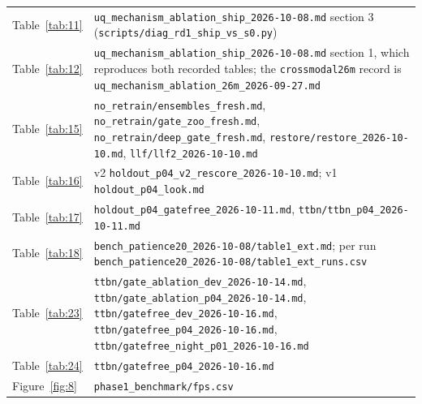 \documentclass[10pt]{article}
\begin{document}
\begin{table}[htbp]
\begin{tabularx}{\linewidth}{l>{\raggedright\arraybackslash}X}
Table~\ref{tab:11} & \texttt{uq\_\allowbreak{}mechanism\_\allowbreak{}ablation\_\allowbreak{}ship\_\allowbreak{}2026-10-08.md} section 3 (\texttt{scripts/\allowbreak{}diag\_\allowbreak{}rd1\_\allowbreak{}ship\_\allowbreak{}vs\_\allowbreak{}s0.py}) \\
Table~\ref{tab:12} & \texttt{uq\_\allowbreak{}mechanism\_\allowbreak{}ablation\_\allowbreak{}ship\_\allowbreak{}2026-10-08.md} section 1, which reproduces both recorded tables; the \texttt{crossmodal26m} record is \texttt{uq\_\allowbreak{}mechanism\_\allowbreak{}ablation\_\allowbreak{}26m\_\allowbreak{}2026-09-27.md} \\
Table~\ref{tab:15} & \texttt{no\_\allowbreak{}retrain/\allowbreak{}ensembles\_\allowbreak{}fresh.md}, \texttt{no\_\allowbreak{}retrain/\allowbreak{}gate\_\allowbreak{}zoo\_\allowbreak{}fresh.md}, \texttt{no\_\allowbreak{}retrain/\allowbreak{}deep\_\allowbreak{}gate\_\allowbreak{}fresh.md}, \texttt{restore/\allowbreak{}restore\_\allowbreak{}2026-10-10.md}, \texttt{llf/\allowbreak{}llf2\_\allowbreak{}2026-10-10.md} \\
Table~\ref{tab:16} & v2 \texttt{holdout\_\allowbreak{}p04\_\allowbreak{}v2\_\allowbreak{}rescore\_\allowbreak{}2026-10-10.md}; v1 \texttt{holdout\_\allowbreak{}p04\_\allowbreak{}look.md} \\
Table~\ref{tab:17} & \texttt{holdout\_\allowbreak{}p04\_\allowbreak{}gatefree\_\allowbreak{}2026-10-11.md}, \texttt{ttbn/\allowbreak{}ttbn\_\allowbreak{}p04\_\allowbreak{}2026-10-11.md} \\
Table~\ref{tab:18} & \texttt{bench\_\allowbreak{}patience20\_\allowbreak{}2026-10-08/\allowbreak{}table1\_\allowbreak{}ext.md}; per run \texttt{bench\_\allowbreak{}patience20\_\allowbreak{}2026-10-08/\allowbreak{}table1\_\allowbreak{}ext\_\allowbreak{}runs.csv} \\
Table~\ref{tab:23} & \texttt{ttbn/\allowbreak{}gate\_\allowbreak{}ablation\_\allowbreak{}dev\_\allowbreak{}2026-10-14.md}, \texttt{ttbn/\allowbreak{}gate\_\allowbreak{}ablation\_\allowbreak{}p04\_\allowbreak{}2026-10-14.md}, \texttt{ttbn/\allowbreak{}gatefree\_\allowbreak{}dev\_\allowbreak{}2026-10-16.md}, \texttt{ttbn/\allowbreak{}gatefree\_\allowbreak{}p04\_\allowbreak{}2026-10-16.md}, \texttt{ttbn/\allowbreak{}gatefree\_\allowbreak{}night\_\allowbreak{}p01\_\allowbreak{}2026-10-16.md} \\
Table~\ref{tab:24} & \texttt{ttbn/\allowbreak{}gatefree\_\allowbreak{}p04\_\allowbreak{}2026-10-16.md} \\
Figure~\ref{fig:8} & \texttt{phase1\_\allowbreak{}benchmark/\allowbreak{}fps.csv} \\
\bottomrule
\end{tabularx}
\end{table}
\FloatBarrier
\end{document}
